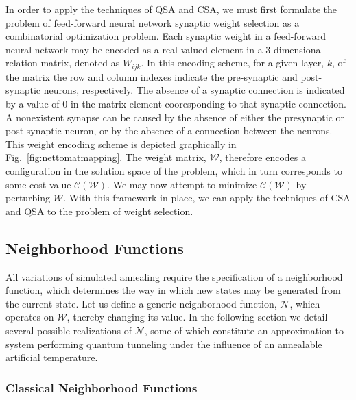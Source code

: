 \documentclass[10pt,journal,cspaper,compsoc]{IEEEtran}
\begin{document}
In order to apply the techniques of QSA and CSA, we must first formulate the problem of feed-forward neural network synaptic weight selection as a combinatorial optimization problem. Each synaptic weight in a feed-forward neural network may be encoded as a real-valued element in a 3-dimensional relation matrix, denoted as $\mathit{W}_{ijk}$. In this encoding scheme, for a given layer, $k$, of the matrix the row and column indexes indicate the pre-synaptic and post-synaptic neurons, respectively. The absence of a synaptic connection is indicated by a value of $0$ in the matrix element cooresponding to that synaptic connection. A nonexistent synapse can be caused by the absence of either the presynaptic or post-synaptic neuron, or by the absence of a connection between the neurons. This weight encoding scheme is depicted graphically in Fig.~\ref{fig:nettomatmapping}. The weight matrix, $\boldsymbol{\mathcal{W}}$, therefore encodes a configuration in the solution space of the problem, which in turn corresponds to some cost value $\mathcal{C}(\boldsymbol{\mathcal{W}})$. We may now attempt to minimize $\mathcal{C}(\boldsymbol{\mathcal{W}})$ by perturbing $\boldsymbol{\mathcal{W}}$. With this framework in place, we can apply the techniques of CSA and QSA to the problem of weight selection.


\subsection{Neighborhood Functions}
\label{scn:neighborhood_fuctions}

All variations of simulated annealing require the specification of a neighborhood function, which determines the way in which new states may be generated from the current state. Let us define a generic neighborhood function, $\mathcal{N}$, which operates on $\boldsymbol{\mathcal{W}}$, thereby changing its value. In the following section we detail several possible realizations of $\mathcal{N}$, some of which constitute an approximation to system performing quantum tunneling under the influence of an annealable artificial temperature.


\subsubsection{Classical Neighborhood Functions}
\label{scn:classical_neighborhood}
\end{document}
